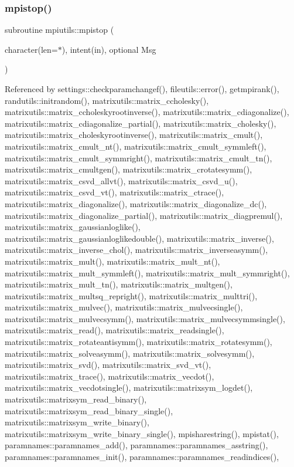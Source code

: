 \subsubsection{\texorpdfstring{mpistop()}{mpistop()}}
{\footnotesize\ttfamily subroutine mpiutils\+::mpistop (\begin{DoxyParamCaption}\item[{character(len=$\ast$), intent(in), optional}]{Msg }\end{DoxyParamCaption})}



Referenced by settings\+::checkparamchangef(), fileutils\+::error(), getmpirank(), randutils\+::initrandom(), matrixutils\+::matrix\+\_\+ccholesky(), matrixutils\+::matrix\+\_\+ccholeskyrootinverse(), matrixutils\+::matrix\+\_\+cdiagonalize(), matrixutils\+::matrix\+\_\+cdiagonalize\+\_\+partial(), matrixutils\+::matrix\+\_\+cholesky(), matrixutils\+::matrix\+\_\+choleskyrootinverse(), matrixutils\+::matrix\+\_\+cmult(), matrixutils\+::matrix\+\_\+cmult\+\_\+nt(), matrixutils\+::matrix\+\_\+cmult\+\_\+symmleft(), matrixutils\+::matrix\+\_\+cmult\+\_\+symmright(), matrixutils\+::matrix\+\_\+cmult\+\_\+tn(), matrixutils\+::matrix\+\_\+cmultgen(), matrixutils\+::matrix\+\_\+crotatesymm(), matrixutils\+::matrix\+\_\+csvd\+\_\+allvt(), matrixutils\+::matrix\+\_\+csvd\+\_\+u(), matrixutils\+::matrix\+\_\+csvd\+\_\+vt(), matrixutils\+::matrix\+\_\+ctrace(), matrixutils\+::matrix\+\_\+diagonalize(), matrixutils\+::matrix\+\_\+diagonalize\+\_\+dc(), matrixutils\+::matrix\+\_\+diagonalize\+\_\+partial(), matrixutils\+::matrix\+\_\+diagpremul(), matrixutils\+::matrix\+\_\+gaussianloglike(), matrixutils\+::matrix\+\_\+gaussianloglikedouble(), matrixutils\+::matrix\+\_\+inverse(), matrixutils\+::matrix\+\_\+inverse\+\_\+chol(), matrixutils\+::matrix\+\_\+inverseasymm(), matrixutils\+::matrix\+\_\+mult(), matrixutils\+::matrix\+\_\+mult\+\_\+nt(), matrixutils\+::matrix\+\_\+mult\+\_\+symmleft(), matrixutils\+::matrix\+\_\+mult\+\_\+symmright(), matrixutils\+::matrix\+\_\+mult\+\_\+tn(), matrixutils\+::matrix\+\_\+multgen(), matrixutils\+::matrix\+\_\+multsq\+\_\+repright(), matrixutils\+::matrix\+\_\+multtri(), matrixutils\+::matrix\+\_\+mulvec(), matrixutils\+::matrix\+\_\+mulvecsingle(), matrixutils\+::matrix\+\_\+mulvecsymm(), matrixutils\+::matrix\+\_\+mulvecsymmsingle(), matrixutils\+::matrix\+\_\+read(), matrixutils\+::matrix\+\_\+readsingle(), matrixutils\+::matrix\+\_\+rotateantisymm(), matrixutils\+::matrix\+\_\+rotatesymm(), matrixutils\+::matrix\+\_\+solveasymm(), matrixutils\+::matrix\+\_\+solvesymm(), matrixutils\+::matrix\+\_\+svd(), matrixutils\+::matrix\+\_\+svd\+\_\+vt(), matrixutils\+::matrix\+\_\+trace(), matrixutils\+::matrix\+\_\+vecdot(), matrixutils\+::matrix\+\_\+vecdotsingle(), matrixutils\+::matrixsym\+\_\+logdet(), matrixutils\+::matrixsym\+\_\+read\+\_\+binary(), matrixutils\+::matrixsym\+\_\+read\+\_\+binary\+\_\+single(), matrixutils\+::matrixsym\+\_\+write\+\_\+binary(), matrixutils\+::matrixsym\+\_\+write\+\_\+binary\+\_\+single(), mpisharestring(), mpistat(), paramnames\+::paramnames\+\_\+add(), paramnames\+::paramnames\+\_\+asstring(), paramnames\+::paramnames\+\_\+init(), paramnames\+::paramnames\+\_\+readindices(), 